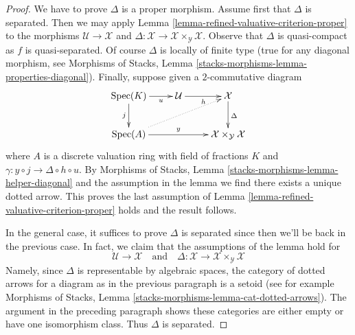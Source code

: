\documentclass[10pt,a4paper]{amsart}
\theoremstyle{plain}
\theoremstyle{definition}
\theoremstyle{remark}
\numberwithin{equation}{subsection}
\def\Spec{\mathop{\mathrm{Spec}}}
\begin{document}
\begin{proof}
We have to prove $\Delta$ is a proper morphism.
Assume first that $\Delta$ is separated. Then we may apply
Lemma \ref{lemma-refined-valuative-criterion-proper}
to the morphisms $\mathcal{U} \to \mathcal{X}$ and
$\Delta : \mathcal{X} \to \mathcal{X} \times_\mathcal{Y} \mathcal{X}$.
Observe that $\Delta$ is quasi-compact as $f$ is quasi-separated.
Of course $\Delta$ is locally of finite type (true for any
diagonal morphism, see Morphisms of Stacks, Lemma
\ref{stacks-morphisms-lemma-properties-diagonal}).
Finally, suppose given a $2$-commutative diagram
$$
\xymatrix{
\Spec(K) \ar[r]_-u \ar[d]_j &
\mathcal{U} \ar[r]_h &
\mathcal{X} \ar[d]^\Delta \\
\Spec(A) \ar[rr]^-y \ar@{..>}[rru] & &
\mathcal{X} \times_\mathcal{Y} \mathcal{X}
}
$$
where $A$ is a discrete valuation ring with field of fractions $K$
and $\gamma : y \circ j \to \Delta \circ h \circ u$.
By Morphisms of Stacks, Lemma \ref{stacks-morphisms-lemma-helper-diagonal}
and the assumption in the lemma
we find there exists a unique dotted arrow.
This proves the last assumption of
Lemma \ref{lemma-refined-valuative-criterion-proper}
holds and the result follows.

\medskip\noindent
In the general case, it suffices to prove $\Delta$ is separated
since then we'll be back in the previous case. In fact, we claim
that the assumptions of the lemma hold for
$$
\mathcal{U} \to \mathcal{X}
\quad\text{and}\quad
\Delta :
\mathcal{X} \to
\mathcal{X} \times_\mathcal{Y} \mathcal{X}
$$
Namely, since $\Delta$ is representable by algebraic spaces, the
category of dotted arrows for a diagram as in the previous paragraph
is a setoid (see for example
Morphisms of Stacks, Lemma \ref{stacks-morphisms-lemma-cat-dotted-arrows}).
The argument in the preceding paragraph shows these categories
are either empty or have one isomorphism class.
Thus $\Delta$ is separated.
\end{proof}
\end{document}
